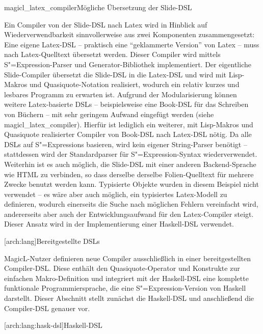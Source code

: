 \documentclass[12pt, a4paper, bibgerm]{scrbook}
\newcommand\lsection{}
\newcommand\lsubsection{}
\newcommand\abb{}
\newcommand\fig{}
\newcommand{\seea}[1]{(siehe \abb{#1})}
\newcommand{\sexp}{S"=Expression}
\newcommand{\sexps}{S"=Expressions}
\begin{document}
\fig{magicl_latex_compiler}{Mögliche Übersetzung der Slide-DSL}

Ein Compiler von der Slide-DSL nach Latex wird in Hinblick auf
Wiederverwendbarkeit sinnvollerweise aus zwei Komponenten
zusammengesetzt: Eine eigene Latex-DSL -- praktisch eine ``geklammerte
Version'' von Latex -- muss nach Latex-Quelltext übersetzt werden.
Dieser Compiler wird mittels \sexp{}-Parser und Generator-Bibliothek
implementiert. Der eigentliche Slide-Compiler übersetzt die Slide-DSL in
die Latex-DSL und wird mit Lisp-Makros und Quasiquote-Notation
realisiert, wodurch ein relativ kurzes und lesbares Programm zu erwarten
ist. Aufgrund der Modularisierung können weitere Latex-basierte DSLs --
beispielsweise eine Book-DSL für das Schreiben von Büchern -- mit sehr
geringem Aufwand eingefügt werden \seea{magicl_latex_compiler}. Hierfür
ist lediglich ein weiterer, mit Lisp-Makros und Quasiquote realisierter
Compiler von Book-DSL nach Latex-DSL nötig. Da alle DSLs auf \sexps{}
basieren, wird kein eigener String-Parser benötigt -- stattdessen wird
der Standardparser für \sexp{}-Syntax wiederverwendet. Weiterhin ist es
auch möglich, die Slide-DSL mit einer anderen Backend-Sprache wie HTML
zu verbinden, so dass derselbe derselbe Folien-Quelltext für mehrere
Zwecke benutzt werden kann. Typisierte Objekte wurden in diesem Beispiel
nicht verwendet -- es wäre aber auch möglich, ein typisiertes
Latex-Modell zu definieren, wodurch einerseits die Suche nach möglichen Fehlern
vereinfacht wird, andererseits aber auch der Entwicklungsaufwand für den
Latex-Compiler steigt. Dieser Ansatz wird in der Implementierung
einer Haskell-DSL verwendet.

\lsection[arch:lang]{Bereitgestellte DSLs}

MagicL-Nutzer definieren neue Compiler ausschließlich in einer
bereitgestellten Compiler-DSL. Diese enthält den Quasiquote-Operator und
Konstrukte zur einfachen Makro-Definition und integriert mit der
Haskell-DSL eine komplette funktionale Programmiersprache, die eine
\sexp{}-Version von Haskell darstellt. Dieser Abschnitt stellt zunächst
die Haskell-DSL und anschließend die Compiler-DSL genauer vor.

\lsubsection[arch:lang:hask-dsl]{Haskell-DSL}
\end{document}
